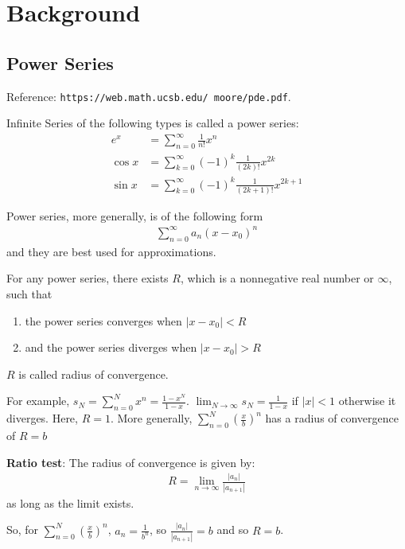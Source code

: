 \documentclass[12pt]{article}
\begin{document}
	\MakeScribeTop

\section{Background} \label{sec:background}

\subsection{Power Series} \label{sec:power}

Reference: \texttt{https://web.math.ucsb.edu/~moore/pde.pdf}.

Infinite Series of the following types is called a power series:
\begin{align*}
    e^x &= \sum_{n = 0}^{\infty} \frac{1}{n!}x^n \\
    \cos x &= \sum_{k = 0}^{\infty} (-1)^k \frac{1}{(2k)!}x^{2k} \\
    \sin x &= \sum_{k = 0}^{\infty} (-1)^k \frac{1}{(2k + 1)!}x^{2k + 1}
\end{align*}
 
Power series, more generally, is of the following form
\begin{align*}
    \sum_{n = 0}^{\infty} a_n(x - x_0)^{n}
\end{align*}
and they are best used for approximations.

For any power series, there exists $R$, which is a nonnegative real number or $\infty$, such that
\begin{enumerate}
    \item the power series converges when $|x - x_0| < R$
    \item and the power series diverges when $|x - x_0| > R$
\end{enumerate}
$R$ is called radius of convergence.

For example, $s_N = \sum_{n = 0}^{N} x^n = \frac{1 - x^N}{1 - x}$. $\lim_{N \to \infty} s_N = \frac{1}{1 - x}$ if $|x| < 1$ otherwise it diverges. Here, $R = 1$. More generally, $\sum_{n = 0}^{N} \left(\frac{x}{b}\right)^n$ has a radius of convergence of $R = b$

\textbf{Ratio test}:
The radius of convergence is given by:
\begin{align*}
    R = \lim_{n \to \infty} \frac{|a_n|}{|a_{n + 1}|}
\end{align*}
as long as the limit exists. 

So, for $\sum_{n = 0}^{N} \left(\frac{x}{b}\right)^n$, $a_n = \frac{1}{b^n}$, so $\frac{|a_n|}{|a_{n + 1}|} = b$ and so $R = b$.
\end{document}
